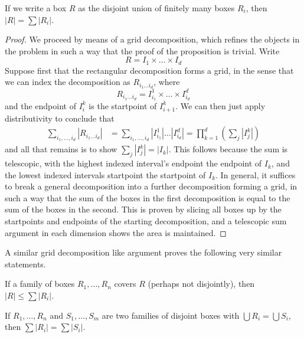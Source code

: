 \begin{lemma}
    If we write a box $R$ as the disjoint union of finitely many boxes $R_i$, then $|R| = \sum |R_i|$.
\end{lemma}
\begin{proof}
    We proceed by means of a grid decomposition, which refines the objects in the problem in such a way that the proof of the proposition is trivial. Write
    \[ R = I_1 \times \dots \times I_d \]
    Suppose first that the rectangular decomposition forms a grid, in the sense that we can index the decomposition as $R_{i_1 \dots i_d}$, where
    \[ R_{i_1 \dots i_d} = I^1_{i_1} \times \dots \times I^d_{i_d} \]
    and the endpoint of $I^k_i$ is the startpoint of $I^k_{i+1}$. We can then just apply distributivity to conclude that
    \begin{align*}
        \sum_{i_1, \dots, i_d} |R_{i_1 \dots i_d}| &= \sum_{i_1, \dots, i_d} |I^1_{i_1}| \dots |I^d_{i_d}| = \prod_{k = 1}^d \left( \sum_j |I^k_j| \right)
    \end{align*}
    and all that remains is to show $\sum_j |I^k_j| = |I_k|$. This follows because the sum is telescopic, with the highest indexed interval's endpoint the endpoint of $I_k$, and the lowest indexed intervals startpoint the startpoint of $I_k$. In general, it suffices to break a general decomposition into a further decomposition forming a grid, in such a way that the sum of the boxes in the first decomposition is equal to the sum of the boxes in the second. This is proven by slicing all boxes up by the startpoints and endpoints of the starting decomposition, and a telescopic sum argument in each dimension shows the area is maintained.
\end{proof}

A similar grid decomposition like argument proves the following very similar statements.

\begin{lemma}
    If a family of boxes $R_1, \dots, R_n$ covers $R$ (perhaps not disjointly), then $|R| \leq \sum |R_i|$.
\end{lemma}

\begin{lemma}
    If $R_1, \dots, R_n$ and $S_1, \dots, S_m$ are two families of disjoint boxes with $\bigcup R_i = \bigcup S_i$, then $\sum |R_i| = \sum |S_i|$.
\end{lemma}

